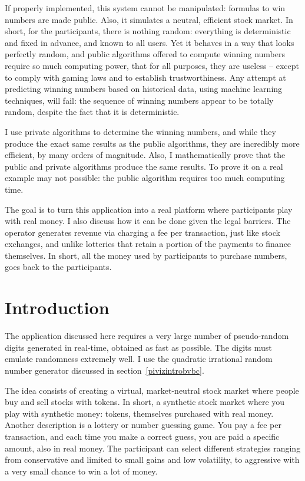 \documentclass[oneside,10pt]{book}
\begin{document}
If properly implemented, this system  cannot be manipulated: formulas to win numbers  are made public. Also, it simulates a neutral, efficient stock market. In short, for the participants, there is nothing random: everything is deterministic and fixed in advance, and known to all users. Yet it behaves in a way that looks perfectly random, and public algorithms offered to compute winning numbers require so much computing power, that for all purposes, they are useless -- except to comply with gaming laws and to establish trustworthiness. Any attempt at predicting winning numbers based on historical data, using machine learning techniques, will fail: the sequence of winning numbers appear to be totally random, despite the fact that it is deterministic.

I use private algorithms to determine the winning numbers, and while they produce the exact same results as the public algorithms, they are incredibly more efficient, by many orders of magnitude. Also, I mathematically prove that the public and private algorithms produce the same results. To prove it on a real example may not possible: the public algorithm requires too much computing time. 

The goal is to turn this application into a real platform where participants play with real money. I also discuss how it can be done given the legal barriers. The operator generates revenue via charging a fee per transaction, just like stock exchanges, and unlike lotteries that retain a portion of the payments to finance themselves. In short, all the money used by participants to purchase numbers, goes back to the participants. 

\section{Introduction}

The application discussed here requires a very large number of pseudo-random digits generated in real-time, obtained as fast as possible. The digits must emulate randomness extremely well. I use the quadratic irrational random number
 generator discussed in section~\ref{pivizintrobvbc}. 

The idea consists of creating a virtual, market-neutral stock market where people buy and sell stocks with tokens. In short, a synthetic stock market where you play with synthetic money: tokens, themselves purchased with real money. Another description is a lottery or number guessing game. You pay a fee per transaction, and each time you make a correct guess, you are paid a specific amount, also in real money. The participant can select different strategies ranging from conservative and limited to small gains and low volatility, to aggressive with a very small chance to win a lot of money.
\end{document}
